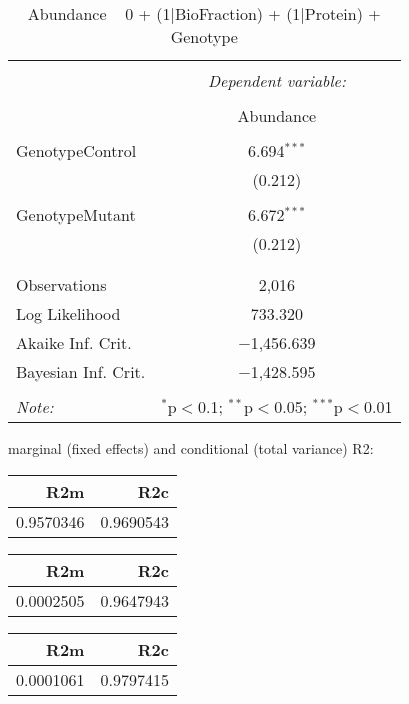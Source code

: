 \documentclass[11pt]{report}
\begin{document}
\begin{table}[!htbp] \centering 
  \caption{Abundance ~ 0 + (1|BioFraction) + (1|Protein) + Genotype} 
  \label{} 
\begin{tabular}{@{\extracolsep{5pt}}lc} 
\\[-1.8ex]\hline 
\hline \\[-1.8ex] 
 & \multicolumn{1}{c}{\textit{Dependent variable:}} \\ 
\cline{2-2} 
\\[-1.8ex] & Abundance \\ 
\hline \\[-1.8ex] 
 GenotypeControl & 6.694$^{***}$ \\ 
  & (0.212) \\ 
  & \\ 
 GenotypeMutant & 6.672$^{***}$ \\ 
  & (0.212) \\ 
  & \\ 
\hline \\[-1.8ex] 
Observations & 2,016 \\ 
Log Likelihood & 733.320 \\ 
Akaike Inf. Crit. & $-$1,456.639 \\ 
Bayesian Inf. Crit. & $-$1,428.595 \\ 
\hline 
\hline \\[-1.8ex] 
\textit{Note:}  & \multicolumn{1}{r}{$^{*}$p$<$0.1; $^{**}$p$<$0.05; $^{***}$p$<$0.01} \\ 
\end{tabular} 
\end{table} 
marginal (fixed effects) and conditional (total variance) R2:

\begin{tabular}{r|r}
\hline
R2m & R2c\\
\hline
0.9570346 & 0.9690543\\
\hline
\end{tabular}

\begin{tabular}{r|r}
\hline
R2m & R2c\\
\hline
0.0002505 & 0.9647943\\
\hline
\end{tabular}

\begin{tabular}{r|r}
\hline
R2m & R2c\\
\hline
0.0001061 & 0.9797415\\
\hline
\end{tabular}
\end{document}
